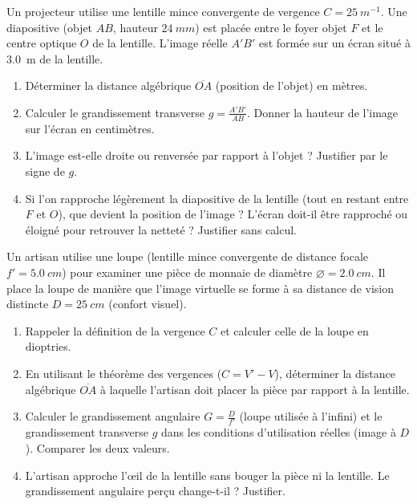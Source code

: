 \documentclass[11pt]{article}
\begin{document}
\begin{exercice}
Un projecteur utilise une lentille mince convergente de vergence $C = \SI{+25}{m^{-1}}$. Une diapositive (objet $AB$, hauteur $\SI{24}{mm}$) est placée entre le foyer objet $F$ et le centre optique $O$ de la lentille. L'image réelle $A'B'$ est formée sur un écran situé à \SI{3,0}{m} de la lentille.
\begin{enumerate}
    \item Déterminer la distance algébrique $\overline{OA}$ (position de l'objet) en mètres.
    \item Calculer le grandissement transverse $g = \frac{A'B'}{AB}$. Donner la hauteur de l'image sur l'écran en centimètres.
    \item L'image est-elle droite ou renversée par rapport à l'objet ? Justifier par le signe de $g$.
    \item Si l'on rapproche légèrement la diapositive de la lentille (tout en restant entre $F$ et $O$), que devient la position de l'image ? L'écran doit-il être rapproché ou éloigné pour retrouver la netteté ? Justifier sans calcul.
\end{enumerate}
\end{exercice}

\begin{exercice}
Un artisan utilise une loupe (lentille mince convergente de distance focale $f' = \SI{5,0}{cm}$) pour examiner une pièce de monnaie de diamètre $\varnothing = \SI{2,0}{cm}$. Il place la loupe de manière que l'image virtuelle se forme à sa distance de vision distincte $D = \SI{25}{cm}$ (confort visuel).
\begin{enumerate}
    \item Rappeler la définition de la vergence $C$ et calculer celle de la loupe en dioptries.
    \item En utilisant le théorème des vergences ($C = V' - V$), déterminer la distance algébrique $\overline{OA}$ à laquelle l'artisan doit placer la pièce par rapport à la lentille.
    \item Calculer le grandissement angulaire $G = \frac{D}{f'}$ (loupe utilisée à l'infini) et le grandissement transverse $g$ dans les conditions d'utilisation réelles (image à $D$). Comparer les deux valeurs.
    \item L'artisan approche l'œil de la lentille sans bouger la pièce ni la lentille. Le grandissement angulaire perçu change-t-il ? Justifier.
\end{enumerate}
\end{exercice}
\end{document}
